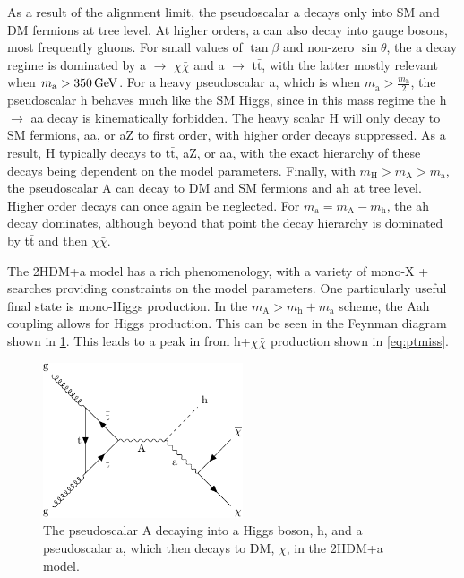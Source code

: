 As a result of the alignment limit, the pseudoscalar a decays only into SM and DM fermions at tree level. At higher orders, a can also decay into gauge bosons, most frequently gluons. For small values of $\tan\beta$ and non-zero $\sin\theta$, the a decay regime is dominated by a $\to$ $\chi\bar{\chi}$ and a $\to$ t$\bar{\mathrm{t}}$, with the latter mostly relevant when $m_\mathrm{a} > \GeV{350}$. For a heavy pseudoscalar a, which is when $m_\mathrm{a} > \frac{m_\mathrm{h}}{2}$, the pseudoscalar h behaves much like the SM Higgs, since in this mass regime the h $\to$ aa decay is kinematically forbidden. The heavy scalar H will only decay to SM fermions, aa, or aZ to first order, with higher order decays suppressed. As a result, H typically decays to t$\bar{\mathrm{t}}$, aZ, or aa, with the exact hierarchy of these decays being dependent on the model parameters. Finally, with $m_\mathrm{H} > m_\mathrm{A} > m_\mathrm{a}$, the pseudoscalar A can decay to DM and SM fermions and ah at tree level. Higher order decays can once again be neglected. For $m_\mathrm{a}=m_\mathrm{A}-m_\mathrm{h}$, the ah decay dominates, although beyond that point the decay hierarchy is dominated by t$\bar{\mathrm{t}}$ and then $\chi\bar{\chi}$.

The 2HDM+a model has a rich phenomenology, with a variety of mono-X + \ptmiss searches providing constraints on the model parameters. One particularly useful final state is mono-Higgs production. In the $m_\mathrm{A} > m_\mathrm{h}+m_\mathrm{a}$ scheme, the Aah coupling allows for Higgs production. This can be seen in the Feynman diagram shown in \cref{fig:2hdma}. This leads to a peak in \ptmiss from h+$\chi\bar{\chi}$ production shown in \cref{eq:ptmiss}.

\begin{figure}[ht]
\centering
\includegraphics[width=0.525\textwidth]{Chapters/Theory/2HDMa.pdf}
\caption{The pseudoscalar A decaying into a Higgs boson, h, and a pseudoscalar a, which then decays to DM, $\chi$, in the 2HDM+a model.}
\label{fig:2hdma}
\end{figure}

